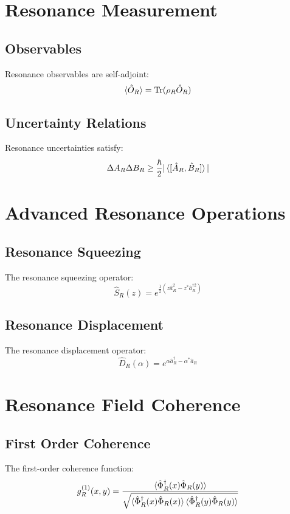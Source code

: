 \documentclass[12pt]{article}
\begin{document}
\section{Resonance Measurement}
\subsection{Observables}
Resonance observables are self-adjoint:
\begin{equation}
\braket{\hat{O}_R} = \text{Tr}(\rho_R\hat{O}_R)
\end{equation}
\subsection{Uncertainty Relations}
Resonance uncertainties satisfy:
\begin{equation}
\Delta A_R\Delta B_R \geq \frac{\hbar}{2}|\braket{[\hat{A}_R,\hat{B}_R]}|
\end{equation}
\section{Advanced Resonance Operations}
\subsection{Resonance Squeezing}
The resonance squeezing operator:
\begin{equation}
\hat{S}_R(z) = e^{\frac{1}{2}(z\hat{a}_R^2 - z^*\hat{a}_R^{\dagger 2})}
\end{equation}
\subsection{Resonance Displacement}
The resonance displacement operator:
\begin{equation}
\hat{D}_R(\alpha) = e^{\alpha\hat{a}_R^\dagger - \alpha^*\hat{a}_R}
\end{equation}
\section{Resonance Field Coherence}
\subsection{First Order Coherence}
The first-order coherence function:
\begin{equation}
g_R^{(1)}(x,y) = \frac{\braket{\hat{\Phi}_R^\dagger(x)\hat{\Phi}_R(y)}}{\sqrt{\braket{\hat{\Phi}_R^\dagger(x)\hat{\Phi}_R(x)}\braket{\hat{\Phi}_R^\dagger(y)\hat{\Phi}_R(y)}}}
\end{equation}
\end{document}
